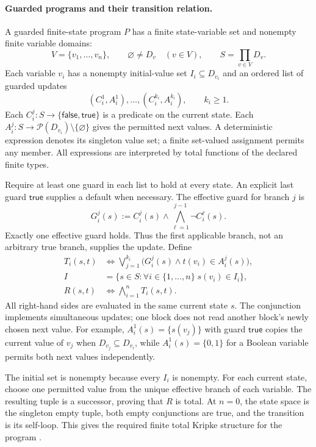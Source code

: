 \paragraph{Guarded programs and their transition relation.}
A guarded finite-state program \(P\) has a finite state-variable set and
nonempty finite variable domains:
\[
 V=\{v_1,\ldots,v_n\},
 \qquad
 \varnothing\ne D_v\quad(v\in V),
 \qquad
 S=\prod_{v\in V}D_v.
\]
Each variable \(v_i\) has a nonempty initial-value set \(I_i\subseteq D_{v_i}\)
and an ordered list of guarded updates
\[
 (C_i^1,A_i^1),\ldots,(C_i^{k_i},A_i^{k_i}),\qquad k_i\geq1.
\]
Each \(C_i^j:S\to\{\mathsf{false},\mathsf{true}\}\) is a predicate on the
current state. Each \(A_i^j:S\to
\mathcal P(D_{v_i})\setminus\{\varnothing\}\) gives the permitted next values.
A deterministic expression denotes its singleton value set; a finite
set-valued assignment permits any member. All expressions are interpreted
by total functions of the declared finite types.

Require at least one guard in each list to hold at every state. An explicit
last guard \(\mathsf{true}\) supplies a default when necessary.
The effective guard for branch \(j\) is
\[
 G_i^j(s):=C_i^j(s)\land
                \bigwedge_{\ell=1}^{j-1}\neg C_i^\ell(s).
\]
Exactly one effective guard holds. Thus the first applicable branch,
not an arbitrary true branch, supplies the update. Define
\[
\begin{aligned}
 T_i(s,t)&\iff
   \bigvee_{j=1}^{k_i}
       \bigl(G_i^j(s)\land t(v_i)\in A_i^j(s)\bigr),\\
 I&=\{s\in S:\forall i\in\{1,\ldots,n\}\;s(v_i)\in I_i\},\\
 R(s,t)&\iff\bigwedge_{i=1}^{n}T_i(s,t).
\end{aligned}
\]
All right-hand sides are evaluated in the same current state \(s\).
The conjunction implements simultaneous updates; one block does not read
another block's newly chosen next value. For example,
\(A_i^1(s)=\{s(v_j)\}\) with guard \(\mathsf{true}\) copies the current value
of \(v_j\) when \(D_{v_j}\subseteq D_{v_i}\), while
\(A_i^1(s)=\{0,1\}\) for a Boolean variable permits both
next values independently.

The initial set is nonempty because every \(I_i\) is nonempty. For each
current state, choose one permitted value from the unique effective branch
of each variable. The resulting tuple is a successor, proving that \(R\)
is total. At \(n=0\), the state space is the singleton empty tuple, both
empty conjunctions are true, and the transition is its self-loop. This gives
the required finite total Kripke structure for the program
\cite[\S\S2.2, 4.2.1]{ClarkeEtAl2003}.

